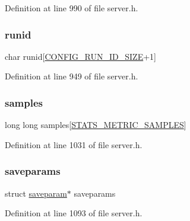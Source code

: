 Definition at line 990 of file server.\+h.

\mbox{\label{structredis_server_a3bd69064f36a186f0a83bbe22cee41d2}} 
\subsubsection{\texorpdfstring{runid}{runid}}
{\footnotesize\ttfamily char runid\mbox{[}\hyperlink{server_8h_aba6794fa3ee28f85165eaed93190f1df}{C\+O\+N\+F\+I\+G\+\_\+\+R\+U\+N\+\_\+\+I\+D\+\_\+\+S\+I\+ZE}+1\mbox{]}}



Definition at line 949 of file server.\+h.

\mbox{\label{structredis_server_a33ae086151bbbc7e1930cd04c3a58ed0}} 
\subsubsection{\texorpdfstring{samples}{samples}}
{\footnotesize\ttfamily long long samples\mbox{[}\hyperlink{server_8h_a225a9e35f2cb8aa663571625bc59a533}{S\+T\+A\+T\+S\+\_\+\+M\+E\+T\+R\+I\+C\+\_\+\+S\+A\+M\+P\+L\+ES}\mbox{]}}



Definition at line 1031 of file server.\+h.

\mbox{\label{structredis_server_a2ef075c5a1090a6b39536909cd779787}} 
\subsubsection{\texorpdfstring{saveparams}{saveparams}}
{\footnotesize\ttfamily struct \hyperlink{structsaveparam}{saveparam}$\ast$ saveparams}



Definition at line 1093 of file server.\+h.

\mbox{\label{structredis_server_ad4654cdc5b77789a9175000290abc831}} 
